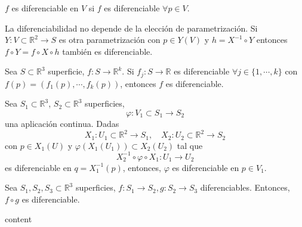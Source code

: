 \begin{obs}
  $f$ es diferenciable en $V$ si $f$ es diferenciable $\forall p \in V$.
\end{obs}

\begin{obs}
  La diferenciabilidad no depende de la elección de parametrización. Si $Y: V \subset \mathbb{R}^{2} \to S$ es otra parametrización con $p \in Y(V)$ y $h = X^{-1} \circ Y$ entonces $f \circ Y = f \circ X \circ h$ también es diferenciable.
\end{obs}

\begin{defn}
  Sea $S \subset \mathbb{R}^{3}$ superficie, $f: S \to \mathbb{R}^{k}$. Si $f_{j}: S \to \mathbb{R}$ es diferenciable $\forall j \in \{ 1, \cdots, k \}$ con $f(p) = ( f_{1}(p), \cdots , f_{k}(p) )$, entonces $f$ es diferenciable.
\end{defn}

\begin{defn}
  Sea $S_{1} \subset \mathbb{R}^{3}$, $S_{2} \subset \mathbb{R}^{3}$ superficies,
  \[
    \varphi: V_{1} \subset S_{1} \to S_{2}
  \]
  una aplicación continua. Dadas
  \[
    X_{1}: U_{1} \subset \mathbb{R}^{2} \to S_{1}, \quad X_{2}: U_{2} \subset \mathbb{R}^{2} \to S_{2}
  \]
  con $p \in X_{1}(U)$ y $\varphi(X_{1}(U_{1})) \subset X_{2}(U_{2})$ tal que
  \[
    X_{2}^{-1} \circ \varphi \circ X_{1} : U_{1} \to U_{2}
  \]
  es diferenciable en $q = X_{1}^{-1}(p)$, entonces, $\varphi$ es diferenciable en $p \in V_{1}$.
\end{defn}

\begin{prop}
  Sea $S_{1},S_{2},S_{3} \subset \mathbb{R}^{3}$ superficies, $f : S_{1} \to S_{2}, g : S_{2} \to S_{3}$ diferenciables. Entonces, $f \circ g$ es diferenciable.
\end{prop}

\begin{dem}
  content
\end{dem}

%

